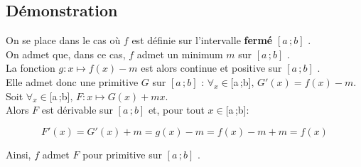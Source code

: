 \documentclass[12px]{article}
\newcommand\I{$[a\,;b]$ }
\begin{document}
	\subsection{Démonstration}
	On se place dans le cas où $f$ est définie sur l'intervalle \textbf{fermé} \I.\\
	On admet que, dans ce cas, $f$ admet un minimum $m$ sur \I.\\
	La fonction $g:x\mapsto f(x)-m$ est alors continue et positive sur \I.\\
	Elle admet donc une primitive $G$ sur \I : $\forall_{x} \in \I, \, G'(x) = f(x) -m$.\\
	Soit $\forall_{x} \in \I, \, F: x \mapsto G(x) + mx$.\\
	Alors $F$ est dérivable sur \I et, pour tout $x \in \I$:
	\begin{center}
		\begin{displaymath}
			F'(x) = G'(x) + m = g(x) - m = f(x) -m +m = f(x)
		\end{displaymath}
	\end{center}
	Ainsi, $f$ admet $F$ pour primitive sur \I.
	
\end{document}
